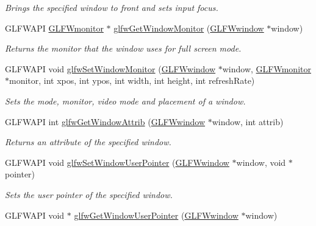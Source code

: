 \begin{DoxyCompactItemize}
\begin{DoxyCompactList}\small\item\em Brings the specified window to front and sets input focus. \end{DoxyCompactList}\item 
G\+L\+F\+W\+A\+PI \hyperlink{group__monitor_ga8d9efd1cde9426692c73fe40437d0ae3}{G\+L\+F\+Wmonitor} $\ast$ \hyperlink{group__window_gad441645a53bc9274a0ee163d40f0c637}{glfw\+Get\+Window\+Monitor} (\hyperlink{group__window_ga3c96d80d363e67d13a41b5d1821f3242}{G\+L\+F\+Wwindow} $\ast$window)
\begin{DoxyCompactList}\small\item\em Returns the monitor that the window uses for full screen mode. \end{DoxyCompactList}\item 
G\+L\+F\+W\+A\+PI void \hyperlink{group__window_ga12fabf78575e59c00f822f323ae0b6ae}{glfw\+Set\+Window\+Monitor} (\hyperlink{group__window_ga3c96d80d363e67d13a41b5d1821f3242}{G\+L\+F\+Wwindow} $\ast$window, \hyperlink{group__monitor_ga8d9efd1cde9426692c73fe40437d0ae3}{G\+L\+F\+Wmonitor} $\ast$monitor, int xpos, int ypos, int width, int height, int refresh\+Rate)
\begin{DoxyCompactList}\small\item\em Sets the mode, monitor, video mode and placement of a window. \end{DoxyCompactList}\item 
G\+L\+F\+W\+A\+PI int \hyperlink{group__window_ga1bb0c7e100418e284dbb800789c63d40}{glfw\+Get\+Window\+Attrib} (\hyperlink{group__window_ga3c96d80d363e67d13a41b5d1821f3242}{G\+L\+F\+Wwindow} $\ast$window, int attrib)
\begin{DoxyCompactList}\small\item\em Returns an attribute of the specified window. \end{DoxyCompactList}\item 
G\+L\+F\+W\+A\+PI void \hyperlink{group__window_gacc9e68faee3c1763b54cd9bc405cf43e}{glfw\+Set\+Window\+User\+Pointer} (\hyperlink{group__window_ga3c96d80d363e67d13a41b5d1821f3242}{G\+L\+F\+Wwindow} $\ast$window, void $\ast$pointer)
\begin{DoxyCompactList}\small\item\em Sets the user pointer of the specified window. \end{DoxyCompactList}\item 
G\+L\+F\+W\+A\+PI void $\ast$ \hyperlink{group__window_gad07c1ae8809c4f47e55ad8cc3f60e794}{glfw\+Get\+Window\+User\+Pointer} (\hyperlink{group__window_ga3c96d80d363e67d13a41b5d1821f3242}{G\+L\+F\+Wwindow} $\ast$window)

\end{DoxyCompactItemize}
